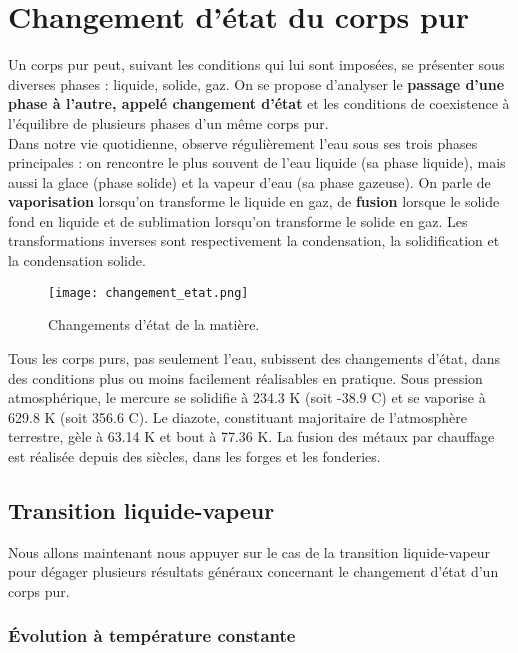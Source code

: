 \documentclass[11pt,a4paper]{report}
\begin{document}
\newpage
\section{Changement d'état du corps pur}

Un corps pur peut, suivant les conditions qui lui sont imposées, se présenter sous diverses phases : liquide, solide, gaz. On se propose d'analyser le \textbf{passage d'une phase à l'autre, appelé changement d'état} et les conditions de coexistence à l'équilibre de plusieurs phases d'un même corps pur.\\

Dans notre vie quotidienne, observe régulièrement l'eau sous ses trois phases principales : on rencontre le plus souvent de l'eau liquide (sa phase liquide), mais aussi la glace (phase solide) et la vapeur d'eau (sa phase gazeuse). On parle de \textbf{vaporisation} lorsqu'on transforme le liquide en gaz, de \textbf{fusion} lorsque le solide fond en liquide et de sublimation lorsqu'on transforme le solide en gaz. Les transformations inverses sont respectivement la condensation, la solidification et la condensation solide.\\

\begin{figure}[h!]
	\begin{center}
		\texttt{[image: changement\_etat.png]}
	\end{center}
	\caption{Changements d'état de la matière.}
\end{figure}

Tous les corps purs, pas seulement l'eau, subissent des changements d'état, dans des conditions plus ou moins facilement réalisables en pratique. Sous pression atmosphérique, le mercure se solidifie à 234.3 K (soit -38.9 \degree C) et se vaporise à 629.8 K (soit 356.6 \degree C). Le diazote, constituant majoritaire de l'atmosphère terrestre, gèle à 63.14 K et bout à 77.36 K. La fusion des métaux par chauffage est réalisée depuis des siècles, dans les forges et les fonderies.

\subsection{Transition liquide-vapeur}

Nous allons maintenant nous appuyer sur le cas de la transition liquide-vapeur pour dégager plusieurs résultats généraux concernant le changement d'état d'un corps pur.

\subsubsection*{Évolution à température constante}
\end{document}

